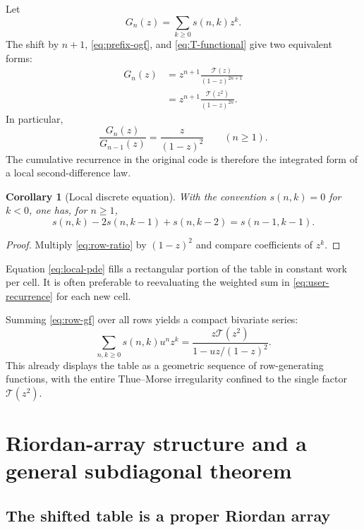 \documentclass[11pt,oneside]{article}
\newtheorem{corollary}[theorem]{Corollary}
\theoremstyle{definition}
\theoremstyle{remark}
\newcommand{\TM}{\mathcal T}
\begin{document}
Let
\[
 G_n(z)=\sum_{k\ge0}s(n,k)z^k.
\]
The shift by $n+1$, \eqref{eq:prefix-ogf}, and
\eqref{eq:T-functional} give two equivalent forms:
\begin{align}
 G_n(z)
 &=z^{n+1}\frac{\TM(z)}{(1-z)^{2n+1}}
 \label{eq:row-gf-first}\\
 &=z^{n+1}\frac{\TM(z^2)}{(1-z)^{2n}}.
 \label{eq:row-gf}
\end{align}
In particular,
\begin{equation}
 \frac{G_n(z)}{G_{n-1}(z)}=\frac{z}{(1-z)^2}
 \qquad(n\ge1).
 \label{eq:row-ratio}
\end{equation}
The cumulative recurrence in the original code is therefore the integrated
form of a local second-difference law.

\begin{corollary}[Local discrete equation]
\label{cor:local-pde}
With the convention $s(n,k)=0$ for $k<0$, one has, for $n\ge1$,
\begin{equation}
 s(n,k)-2s(n,k-1)+s(n,k-2)=s(n-1,k-1).
 \label{eq:local-pde}
\end{equation}
\end{corollary}

\begin{proof}
Multiply \eqref{eq:row-ratio} by $(1-z)^2$ and compare coefficients of
$z^k$.
\end{proof}

Equation \eqref{eq:local-pde} fills a rectangular portion of the table in
constant work per cell.  It is often preferable to reevaluating the weighted
sum in \eqref{eq:user-recurrence} for each new cell.

Summing \eqref{eq:row-gf} over all rows yields a compact bivariate series:
\begin{equation}
 \sum_{n,k\ge0}s(n,k)u^nz^k
 =\frac{z\TM(z^2)}{1-uz/(1-z)^2}.
 \label{eq:bivariate-s}
\end{equation}
This already displays the table as a geometric sequence of row-generating
functions, with the entire Thue--Morse irregularity confined to the single
factor $\TM(z^2)$.

\section{Riordan-array structure and a general subdiagonal theorem}
\label{sec:riordan}

\subsection{The shifted table is a proper Riordan array}
\end{document}
